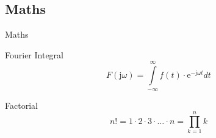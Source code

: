 \documentclass[compress,aspectratio=169]{beamer}
\begin{document}
\subsection{Maths}
\begin{frame}{Maths}
    \begin{block}{Fourier Integral}
        \begin{equation*}
            F(\textrm{j}\omega) = \int\limits_{-\infty}^{\infty} f(t)\cdot\textrm{e}^{-\textrm{j}\omega t} dt
        \end{equation*}
    \end{block}
    \begin{block}{Factorial}
        \begin{equation*}
            n! = 1\cdot 2 \cdot 3 \cdot\ldots\cdot n = \prod_{k=1}^n k
        \end{equation*}
    \end{block}
\end{frame}
\end{document}
